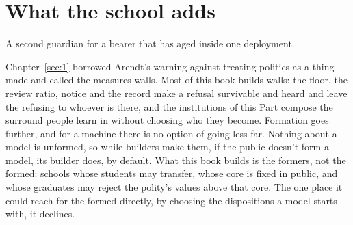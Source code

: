 \section{What the school adds}
\label{sec:28.12}
A second guardian for a bearer that has aged inside one deployment.

Chapter~\ref{sec:1} borrowed Arendt's warning against treating politics as a thing made and called the measures walls. Most of this book builds walls: the floor, the review ratio, notice and the record make a refusal survivable and heard and leave the refusing to whoever is there, and the institutions of this Part compose the surround people learn in without choosing who they become. Formation goes further, and for a machine there is no option of going less far. Nothing about a model is unformed, so while builders make them, if the public doesn't form a model, its builder does, by default. What this book builds is the formers, not the formed: schools whose students may transfer, whose core is fixed in public, and whose graduates may reject the polity's values above that core. The one place it could reach for the formed directly, by choosing the dispositions a model starts with, it declines.
